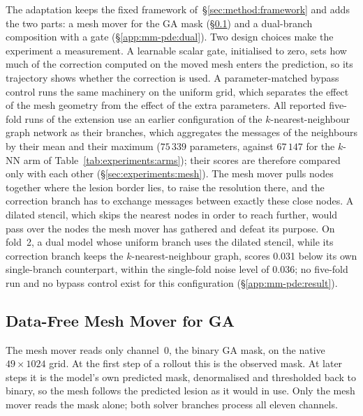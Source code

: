 The adaptation keeps the fixed framework of~\S\ref{sec:method:framework}
and adds the two parts: a mesh mover for the GA mask
(\S\ref{app:mm-pde:dmm}) and a dual-branch composition with a gate
(\S\ref{app:mm-pde:dual}). Two design choices make the experiment a
measurement. A learnable scalar gate, initialised to zero, sets how much
of the correction computed on the moved mesh enters the prediction, so its
trajectory shows whether the correction is used. A parameter-matched
bypass control runs the same machinery on the uniform grid, which
separates the effect of the mesh geometry from the effect of the extra
parameters. All reported five-fold runs of the extension use an earlier
configuration of the $k$-nearest-neighbour graph network as their
branches, which aggregates the messages of the neighbours by their mean
and their maximum ($75\,339$ parameters, against $67\,147$ for the $k$-NN
arm of Table~\ref{tab:experiments:arms}); their scores are therefore
compared only with each other (\S\ref{sec:experiments:mesh}). The mesh mover pulls nodes together where the
lesion border lies, to raise the resolution there, and the correction
branch has to exchange messages between exactly these close nodes. A
dilated stencil, which skips the nearest nodes in order to reach further,
would pass over the nodes the mesh mover has gathered and defeat its
purpose. On fold~2, a dual model whose uniform branch uses the dilated
stencil, while its correction branch keeps the $k$-nearest-neighbour
graph, scores 0.031 below its own single-branch counterpart, within the
single-fold noise level of 0.036; no five-fold run and no bypass control
exist for this configuration (\S\ref{app:mm-pde:result}).

\subsection{Data-Free Mesh Mover for GA}
\label{app:mm-pde:dmm}

The mesh mover reads only channel~0, the binary GA mask, on the native
$49 \times 1024$ grid. At the first step of a rollout this is the observed
mask. At later steps it is the model's own predicted mask, denormalised and
thresholded back to binary, so the mesh follows the predicted lesion as it
would in use. Only the mesh mover reads the mask alone; both solver
branches process all eleven channels.


